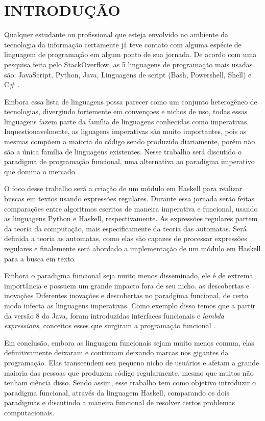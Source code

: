 \section{INTRODUÇÃO}
Qualquer estudante ou profissional que esteja envolvido no ambiente da tecnologia da informação certamente já teve contato com alguma espécie de linguagem de programação em algum ponto de sua jornada.
De acordo com uma pesquisa feita pelo StackOverflow, as 5 linguagens de programação mais usadas são: JavaScript, Python, Java, Linguagens de script (Bash, Powershell, Shell) e C\# \cite{stack-overflow}.

Embora essa lista de linguagens possa parecer como um conjunto heterogêneo de tecnologias, divergindo fortemente em convençoes e nichos de uso, todas essas linguagens fazem parte da família de linguagens conhecidas como imperativas.
Inquestionavelmente, as liguagens imperativas são muito importantes, pois as mesmas compõem a maioria do código sendo produzido diariamente, porém não são a única família de linguagens existentes.
Nesse trabalho será discutido o paradigma de programação funcional, uma alternativa ao paradigma imperativo que domina o mercado.

O foco desse trabalho será a criação de um módulo em Haskell para realizar buscas em textos usando expressões regulares.
Durante essa jornada serão feitas comparações entre algoritmos escritos de maneira imperativa e funcional, usando as linguagens Python e Haskell, respectivamente.
As expressões regulares partem da teoria da computação, mais especificamente da teoria das automatas.
Será definida a teoria as automatas, como elas são capazes de processar expressões regulares e finalemente será abordado a implementação de um módulo em Haskell para a busca em texto.

Embora o paradigma funcional seja muito menos disseminado, ele é de extrema importância e possuem um grande impacto fora de seu nicho. as descobertas e inovações 
Diferentes inovações e descobertas no paradgima funcional, de certo modo infecta as linguagens imperativas.
Como exemplo disso temos que a partir da versão 8 do Java, foram introduzidas interfaces funcionais e \emph{lambda expressions}, conceitos esses que surgiram a programação funcional \cite{java8}.

Em conclusão, embora as linguagem funcionais sejam muito menos comum, elas definitivamente deixaram e continuam deixando marcas nos gigantes da programação.
Elas transcendem seu pequeno nicho de usuários e afetam a grande maioria das pessoas que produzem código regularmente, mesmo que muitos não tenham ciência disso.
Sendo assim, esse trabalho tem como objetivo introduzir o paradigma funcional, através da linguagem Haskell, comparando os dois paradigmas e discutindo a maneira funcional de resolver certos problemas computacionais.
